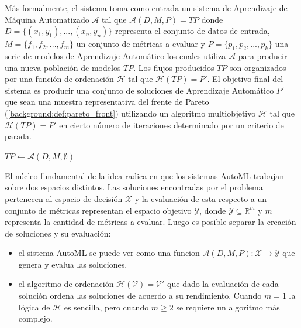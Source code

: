 M\'as formalmente, 
el sistema toma como entrada un sistema de Aprendizaje de M\'aquina Automatizado $\mathcal{A}$ tal que $\mathcal{A}(D, M, P) = TP$ donde $D = \{(x_1, y_1), ..., (x_n, y_n)\}$ representa el conjunto de datos de entrada, $M = \{f_1, f_2, ..., f_m\}$ un conjunto de m\'etricas a evaluar y $P = \{p_1, p_2, ..., p_k\}$ una serie de modelos de Aprendizaje Autom\'atico los cuales utiliza $\mathcal{A}$ para producir una nueva poblaci\'on de modelos $TP$. 
Los flujos producidos $TP$ son organizados por una funci\'on de ordenaci\'on $\mathcal{H}$ tal que $\mathcal{H}(TP) = P'$. 
El objetivo final del sistema es producir una conjunto de soluciones de Aprendizaje Autom\'atico $P'$ que sean una muestra representativa del frente de Pareto (\ref{background:def:pareto_front}) utilizando un algoritmo multiobjetivo  $\mathcal{H}$ tal que $\mathcal{H}(TP) = P'$ en cierto n\'umero de iteraciones determinado por un criterio de parada. 
\begin{algorithm}[ht]\caption{}
    
    $TP \gets \mathcal{A}(D, M, \emptyset)$ 
\end{algorithm}

El n\'ucleo fundamental de la idea radica en que los sistemas AutoML trabajan sobre dos espacios distintos. Las soluciones encontradas por el problema pertenecen al espacio de decisi\'on $\mathcal{X}$ y la evaluaci\'on de esta respecto a un conjunto de m\'etricas representan el espacio objetivo $\mathcal{Y}$, donde $\mathcal{Y} \subseteq \mathbb{R}^m$ y  $m$ representa la cantidad de m\'etricas a evaluar. 
Luego es posible separar la creaci\'on de soluciones y su evaluaci\'on: 
\begin{itemize}
    \item el sistema AutoML se puede ver como una funcion $\mathcal{A}(D, M, P): \mathcal{X} \rightarrow \mathcal{Y}$ que genera y evalua las soluciones.
    \item el algoritmo de ordenaci\'on $\mathcal{H(V) = V'}$ que dado la evaluaci\'on de cada soluci\'on ordena las soluciones de acuerdo a su rendimiento. Cuando $m = 1$ la l\'ogica de $\mathcal{H}$ es sencilla, pero cuando $m \geq 2$  se requiere un algoritmo m\'as complejo.
\end{itemize}


